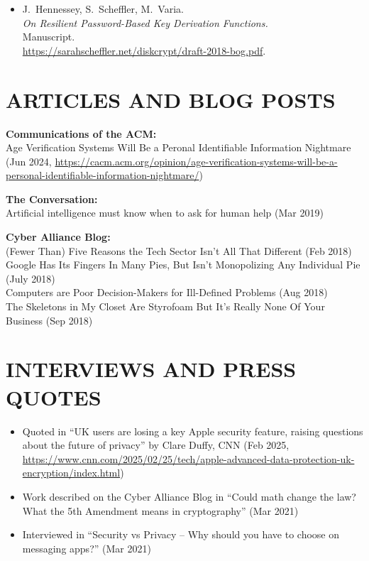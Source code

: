\documentclass{res}
\begin{document}
\begin{resume}
\begin{itemize}
\item[\bog] J.~Hennessey, S.~Scheffler, M.~Varia. \\
\emph{On Resilient Password-Based Key Derivation Functions.} \\
Manuscript.  \\
\url{https://sarahscheffler.net/diskcrypt/draft-2018-bog.pdf}.
\end{itemize}




\section{ARTICLES AND BLOG POSTS}  
\vspace{0.1in}

\textbf{Communications of the ACM:} \\
    Age Verification Systems Will Be a Peronal Identifiable Information Nightmare (Jun 2024, \url{https://cacm.acm.org/opinion/age-verification-systems-will-be-a-personal-identifiable-information-nightmare/})

\textbf{The Conversation:} \\         
    Artificial intelligence must know when to ask for human help (Mar 2019) 

\textbf{Cyber Alliance Blog:} \\         
    (Fewer Than) Five Reasons the Tech Sector Isn't All That Different (Feb 2018) \\
    Google Has Its Fingers In Many Pies, But Isn't Monopolizing Any Individual Pie (July 2018) \\
    Computers are Poor Decision-Makers for Ill-Defined Problems (Aug 2018) \\
    The Skeletons in My Closet Are Styrofoam But It's Really None Of Your Business (Sep 2018) 


\section{INTERVIEWS AND PRESS QUOTES}
\vspace{0.25in}

\begin{itemize}
    \item Quoted in ``UK users are losing a key Apple security feature, raising questions about the future of privacy'' by Clare Duffy, CNN (Feb 2025,
        \url{https://www.cnn.com/2025/02/25/tech/apple-advanced-data-protection-uk-encryption/index.html}) \\
    \item Work described on the Cyber Alliance Blog in ``Could math change the law? What the 5th Amendment means in cryptography'' (Mar 2021) \\
    \item Interviewed in ``Security vs Privacy -- Why should you have to choose on messaging apps?'' (Mar 2021)
\end{itemize}


\end{resume}
\end{document}
